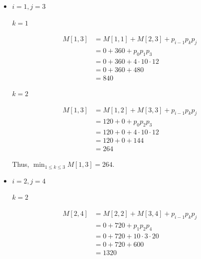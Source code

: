 \documentclass[12pt]{article}
\begin{document}
\begin{enumerate}[1.]
\begin{itemize}
\begin{itemize}
\begin{enumerate}[1.]
\begin{enumerate}[1)]
                    \begin{itemize}
                        \item $i = 1, j = 3$

                        \bigskip

                        \underline{$k = 1$}

                        \begin{align}
                            M[1,3] &= M[1,1] + M[2,3] + p_{i-1}p_kp_j\\
                            &= 0 + 360 + p_0p_1p_3\\
                            &= 0 + 360 + 4 \cdot 10 \cdot 12\\
                            &= 0 + 360 + 480\\
                            &= 840
                        \end{align}

                        \bigskip

                        \underline{$k = 2$}

                        \begin{align}
                            M[1,3] &= M[1,2] + M[3,3] + p_{i-1}p_kp_j\\
                            &= 120 + 0 + p_0p_2p_3\\
                            &= 120 + 0 + 4 \cdot 10 \cdot 12\\
                            &= 120 + 0 + 144\\
                            &= 264
                        \end{align}

                        \bigskip

                        Thus, $\min_{1 \leq k \leq 3} M[1,3] = 264$.

                        \item $i = 2, j = 4$

                        \bigskip

                        \underline{$k = 2$}

                        \begin{align}
                            M[2,4] &= M[2,2] + M[3,4] + p_{i-1}p_kp_j\\
                            &= 0 + 720 + p_1p_2p_4\\
                            &= 0 + 720 + 10 \cdot 3 \cdot 20\\
                            &= 0 + 720 + 600\\
                            &= 1320
                        \end{align}


\end{itemize}
\end{enumerate}
\end{enumerate}
\end{itemize}
\end{itemize}
\end{enumerate}
\end{document}
